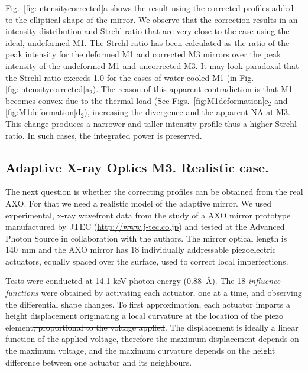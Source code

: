 \documentclass{iucr}
\newcommand{\replace}[2]{{\color{blue}#1}{\color{blue}\sout{#2}}}
\begin{document}
Fig.~\ref{fig:intensitycorrected}a shows the result using the corrected profiles added to the elliptical shape of the mirror. We observe that the correction results in an intensity distribution and Strehl ratio that are very close to the case using the ideal, undeformed M1. The Strehl ratio has been calculated as the ratio of the peak intensity for the deformed M1 and corrected M3 mirrors over the peak intensity of the undeformed M1 and uncorrected M3. It may look paradoxal that the Strehl ratio exceeds 1.0 for the cases of water-cooled M1 (in Fig.\ref{fig:intensitycorrected}a$_2$). The reason of this apparent contradiction is that M1 becomes convex due to the thermal load (See Figs.~\ref{fig:M1deformation}c$_2$ and \ref{fig:M1deformation}d$_2$), increasing the divergence and the apparent NA at M3. This change produces a narrower and taller intensity profile thus a higher Strehl ratio.
In such cases, the integrated power is preserved.

\subsection{Adaptive X-ray Optics M3. Realistic case.}

The next question is whether the correcting profiles can be obtained from the real AXO. For that we need a realistic model of the adaptive mirror. We used experimental, x-ray wavefront data from the study of a AXO mirror prototype manufactured by JTEC (\url{http://www.j-tec.co.jp}) and tested at the Advanced Photon Source in collaboration with the authors. The mirror optical length is 140~mm and the AXO mirror has 18  individually addressable piezoelectric actuators, equally spaced over the surface, used to correct local imperfections.


Tests were conducted at 14.1 keV photon energy (0.88~\AA). The 18 \emph{influence functions} were obtained by activating each actuator, one at a time, and observing the differential shape changes. To first approximation, each actuator imparts a \replace{height displacement originating a}{} local curvature at the location of the piezo element\replace{}{, proportional to the voltage applied}. \replace{The displacement is ideally a linear function of the applied voltage, therefore the maximum displacement depends on the maximum voltage, and the maximum curvature depends on the height difference between one actuator and its neighbours.}{}
\end{document}
